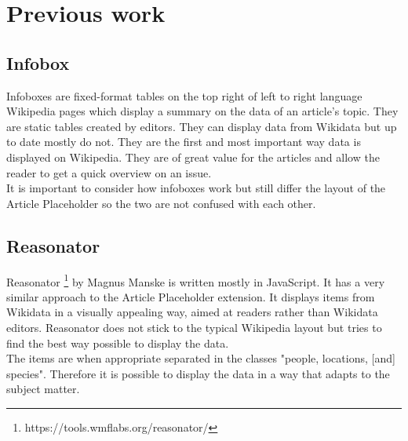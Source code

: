 \chapter{Previous work}
\section{Infobox}
Infoboxes are fixed-format tables on the top right of left to right language Wikipedia pages which display a summary on the data of an article's topic. They are static tables created by editors. They can display data from Wikidata but up to date mostly do not. They are the first and most important way data is displayed on Wikipedia. They are of great value for the articles and allow the reader to get a quick overview on an issue. \\
It is important to consider how infoboxes work but still differ the layout of the Article Placeholder so the two are not confused with each other.

\section{Reasonator}
Reasonator \footnote{https://tools.wmflabs.org/reasonator/} by Magnus Manske is written mostly in JavaScript. It has a very similar approach to the Article Placeholder extension. It displays items from Wikidata in a visually appealing way, aimed at readers rather than Wikidata editors. Reasonator does not stick to the typical Wikipedia layout but tries to find the best way possible to display the data. \\
The items are when appropriate separated in the classes   "people, locations, [and] species". Therefore it is possible to display the data in a way that adapts to the subject matter. \\

